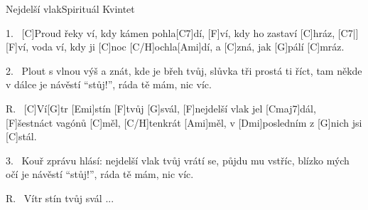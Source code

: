 \begin{song}{Nejdelší vlak}{Spirituál Kvintet}

\begin{xverse}{1.~}
[C]Proud řeky ví, kdy kámen pohla[C7]dí,
[F]ví, kdy ho zastaví [C]hráz, [C7|]{}
[F]ví, voda ví, kdy ji [C]noc [C/H]ochla[Ami]dí,
a [C]zná, jak [G]pálí [C]mráz.
\end{xverse}


\begin{xverse}{2.~}
Plout s vlnou výš a znát, kde je břeh tvůj,
slůvka tři prostá ti říct,
tam někde v dálce je návěstí ``stůj!'',
ráda tě mám, nic víc.
\end{xverse}


\begin{xverse}{R.~}
[C]Ví[G]tr [Emi]stín [F]tvůj [G]svál,
[F]nejdelší vlak jel [Cmaj7]dál,
[F]{šest}náct vagónů [C]měl, [C/H]tenkrát [Ami]měl,
v [Dmi]posledním z [G]nich jsi [C]stál.
\end{xverse}


\begin{xverse}{3.~}
Kouř zprávu hlásí: nejdelší vlak tvůj
vrátí se, půjdu mu vstříc,
blízko mých očí je návěstí ``stůj!'',
ráda tě mám, nic víc.
\end{xverse}


\begin{xverse}{R.~}
Vítr stín tvůj svál ...
\end{xverse}

\end{song}
\chords{\chordCmajSeven \chordCH}

